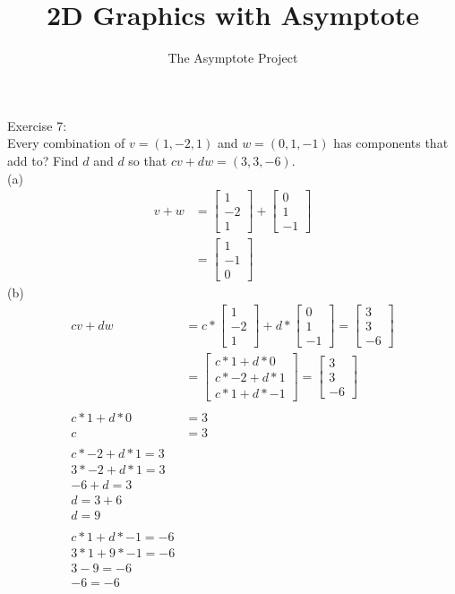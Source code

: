 \documentclass[12pt]{article}
\title{2D Graphics with Asymptote}
\author{The Asymptote Project}
\begin{document}
Exercise 7:\\
Every combination of $v=(1,-2,1)$ and $w=(0,1,-1)$ has components that  add to? Find $d$ and $d$ so that $cv+dw=(3,3,-6)$.\\
(a)\\
\begin{align*}
	v+w &= \begin{bmatrix}1\\-2\\1\end{bmatrix} + \begin{bmatrix}0\\1\\-1\end{bmatrix}\\
	&= \begin{bmatrix}1\\-1\\0\end{bmatrix}
\end{align*}
(b)
\begin{align*}
cv+dw &= c*\begin{bmatrix}1\\-2\\1\end{bmatrix} + d*\begin{bmatrix}0\\1\\-1\end{bmatrix} = \begin{bmatrix}3\\3\\-6\end{bmatrix}\\
	&= \begin{bmatrix}c*1+d*0\\c*-2+d*1\\c*1+d*-1\end{bmatrix} = \begin{bmatrix}3\\3\\-6\end{bmatrix}\\
	\\
	c*1+d*0&=3\\
	c&=3\\
	\\
	c*-2+d*1 = 3\\
	3*-2+d*1 = 3\\	
	-6+d = 3\\		
	d = 3 + 6\\			
	d = 9\\		
	\\
	c*1+d*-1=-6\\
	3*1+9*-1=-6\\
	3-9=-6\\	
	-6=-6\\
\end{align*}
\end{document}
